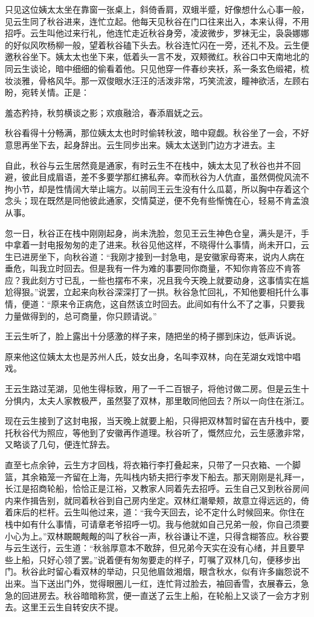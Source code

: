 \documentclass[12pt,UTF8]{ctexbook}
\begin{document}
{{{只见这位姨太太坐在靠窗一张桌上，斜倚香肩，双蛾半蹙，好像想什么心事一般，见云生同了秋谷进来，连忙立起。他每天见秋谷在门口往来出入，本来认得，不用招呼。云生叫他过来行礼，他连忙走近秋谷身旁，凌波微步，罗袜无尘，袅袅娜娜的好似风吹杨柳一般，望着秋谷磕下头去。秋谷连忙闪在一旁，还礼不及。云生便邀秋谷坐下。姨太太也坐下来，低着头一言不发，双颊微红。秋谷口中天南地北的同云生谈论，暗中细细的偷看着他。只见他穿一件春纱夹袄，系一条玄色缎裙，梳妆淡雅，骨格风华。那一双俊眼水汪汪的活泼非常，巧笑流波，瞳神欲活，左顾右盼，宛转关情。正是：

羞态矜持，秋剪横谈之影；欢痕融洽，春添眉妩之云。

秋谷看得十分畅满，那位姨太太也时时偷转秋波，暗中窥觑。秋谷坐了一会，不好意思再坐下去，起身辞出。云生同步出来。姨太太送到门边方才进去。主

自此，秋谷与云生居然竟是通家，有时云生不在栈中，姨太太见了秋谷也并不回避，彼此目成眉语，差不多要学那红拂私奔。幸而秋谷为人伉直，虽然倜傥风流不拘小节，却是性情阔大举止端方。以前同王云生没有什么瓜葛，所以胸中存着这个念头；现在既然是同他彼此通家，交情莫逆，便不免有些惭愧在心，轻易不肯孟浪从事。

忽一日，秋谷正在栈中刚刚起身，尚未洗脸，忽见王云生神色仓皇，满头是汗，手中拿着一封电报匆匆的走了进来。秋谷见他这样，不晓得什么事情，尚未开口，云生已进房坐下，向秋谷道：“我刚才接到一封急电，是安徽家母寄来，说内人病在垂危，叫我立时回去。但是我有一件为难的事要同你商量，不知你肯答应不肯答应？我此刻方寸已乱，一些也摆布不来，况且我今天晚上就要动身，这事情实在尴尬得狠。”说罢，立起来向秋谷深深打了一拱。秋谷急忙回礼，不知他要相托什么事情，便道：“原来令正病危，这自然该立时回去。此间如有什么不了之事，只要我力量做得到的，总可商量，你只顾请说。”

王云生听了，脸上露出十分感激的样子来，随把坐的椅子挪到床边，低声诉说。

原来他这位姨太太也是苏州人氏，妓女出身，名叫李双林，向在芜湖女戏馆中唱戏。

王云生路过芜湖，见他生得标致，用了一千二百银子，将他讨做二房。但是云生十分惧内，太夫人家教极严，虽然娶了双林，那里敢同他回去？所以一向住在浙江。

现在云生接到了这封电报，当天晚上就要上船，只得把双林暂时留在吉升栈中，要托秋谷代为照应，等他到了安徽再作道理。秋谷听了，慨然应允，云生感激非常，又略谈了几句，便连忙辞去。

直至七点余钟，云生方才回栈，将衣箱行李打叠起来，只带了一只衣箱、一个脚篮，其余箱笼一齐留在上海，先叫栈内轿夫把行李发下船去。那天刚刚是礼拜一，长江是招商轮船，恰恰正是江裕，又教家人同着先去招呼。云生自己又到秋谷房间内来作揖告别，就同着秋谷到自己房内坐定。双林红潮晕颊，故意立得远远的，倚着床后的栏杆。云生叫他过来，道：“我今天回去，论不定什么时候回来。你住在栈中如有什么事情，可请章老爷招呼一切。我与他就如自己兄弟一般，你自己须要小心为上。”双林靦靦觍觍的叫了秋谷一声，秋谷谦让不遑，只得含糊答应。秋谷要与云生送行，云生道：“秋翁厚意本不敢辞，但兄弟今天实在没有心绪，并且要早些上船，只好心领了罢。”说着便有匆匆要走的样子，叮嘱了双林几句，便移步出门。秋谷此时留心看双林的举动，只见他眉敛湘烟，眼含秋水，似有许多幽怨说不出来。当下送出门外，觉得眼圈儿一红，连忙背过脸去，袖回香雪，衣展春云，急急的回进房去。秋谷暗暗称赏，便一直送了云生上船，在轮船上又谈了一会方才别去。这里王云生自转安庆不提。

}}}
\end{document}
